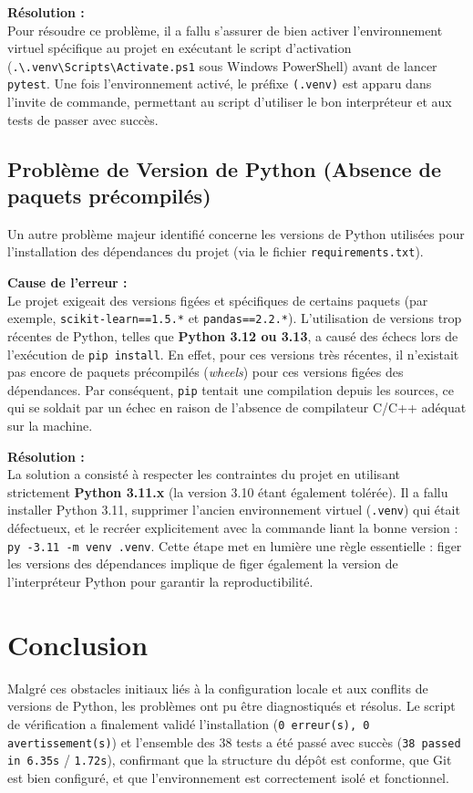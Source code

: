 \documentclass[11pt]{article}
\begin{document}
\textbf{Résolution :} \\
Pour résoudre ce problème, il a fallu s'assurer de bien activer l'environnement virtuel spécifique au projet en exécutant le script d'activation (\texttt{.\textbackslash .venv\textbackslash Scripts\textbackslash Activate.ps1} sous Windows PowerShell) avant de lancer \texttt{pytest}. Une fois l'environnement activé, le préfixe \texttt{(.venv)} est apparu dans l'invite de commande, permettant au script d'utiliser le bon interpréteur et aux tests de passer avec succès.

\subsection{Problème de Version de Python (Absence de paquets précompilés)}
Un autre problème majeur identifié concerne les versions de Python utilisées pour l'installation des dépendances du projet (via le fichier \texttt{requirements.txt}).

\textbf{Cause de l'erreur :} \\
Le projet exigeait des versions figées et spécifiques de certains paquets (par exemple, \texttt{scikit-learn==1.5.*} et \texttt{pandas==2.2.*}). L'utilisation de versions trop récentes de Python, telles que \textbf{Python 3.12 ou 3.13}, a causé des échecs lors de l'exécution de \texttt{pip install}. En effet, pour ces versions très récentes, il n'existait pas encore de paquets précompilés (\textit{wheels}) pour ces versions figées des dépendances. Par conséquent, \texttt{pip} tentait une compilation depuis les sources, ce qui se soldait par un échec en raison de l'absence de compilateur C/C++ adéquat sur la machine.

\textbf{Résolution :} \\
La solution a consisté à respecter les contraintes du projet en utilisant strictement \textbf{Python 3.11.x} (la version 3.10 étant également tolérée). Il a fallu installer Python 3.11, supprimer l'ancien environnement virtuel (\texttt{.venv}) qui était défectueux, et le recréer explicitement avec la commande liant la bonne version : \texttt{py -3.11 -m venv .venv}. Cette étape met en lumière une règle essentielle : figer les versions des dépendances implique de figer également la version de l'interpréteur Python pour garantir la reproductibilité.

\section{Conclusion}
Malgré ces obstacles initiaux liés à la configuration locale et aux conflits de versions de Python, les problèmes ont pu être diagnostiqués et résolus. Le script de vérification a finalement validé l'installation (\texttt{0 erreur(s), 0 avertissement(s)}) et l'ensemble des 38 tests a été passé avec succès (\texttt{38 passed in 6.35s} / \texttt{1.72s}), confirmant que la structure du dépôt est conforme, que Git est bien configuré, et que l'environnement est correctement isolé et fonctionnel.
\end{document}

